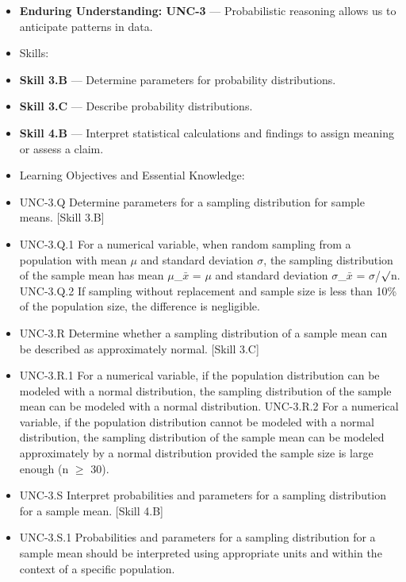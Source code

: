 \documentclass[11pt]{article}
\begin{document}


{\small
\begin{itemize}[leftmargin=1.5em,itemsep=2pt,topsep=2pt]
  \item \textbf{Enduring Understanding: UNC-3} --- Probabilistic reasoning allows us to anticipate patterns in data.
  \item Skills:
  \item \textbf{Skill 3.B} --- Determine parameters for probability distributions.
  \item \textbf{Skill 3.C} --- Describe probability distributions.
  \item \textbf{Skill 4.B} --- Interpret statistical calculations and findings to assign meaning or assess a claim.
  \item Learning Objectives and Essential Knowledge:
  \item UNC-3.Q Determine parameters for a sampling distribution for sample means. [Skill 3.B]
  \item UNC-3.Q.1 For a numerical variable, when random sampling from a population with mean $\mu$ and standard deviation $\sigma$, the sampling distribution of the sample mean has mean $\mu$\_$\bar{x}$ = $\mu$ and standard deviation $\sigma$\_$\bar{x}$ = $\sigma$/$\surd$n. UNC-3.Q.2 If sampling without replacement and sample size is less than 10\% of the population size, the difference is negligible.
  \item UNC-3.R Determine whether a sampling distribution of a sample mean can be described as approximately normal. [Skill 3.C]
  \item UNC-3.R.1 For a numerical variable, if the population distribution can be modeled with a normal distribution, the sampling distribution of the sample mean can be modeled with a normal distribution. UNC-3.R.2 For a numerical variable, if the population distribution cannot be modeled with a normal distribution, the sampling distribution of the sample mean can be modeled approximately by a normal distribution provided the sample size is large enough (n $\geq$ 30).
  \item UNC-3.S Interpret probabilities and parameters for a sampling distribution for a sample mean. [Skill 4.B]
  \item UNC-3.S.1 Probabilities and parameters for a sampling distribution for a sample mean should be interpreted using appropriate units and within the context of a specific population.
\end{itemize}
}
\end{document}
